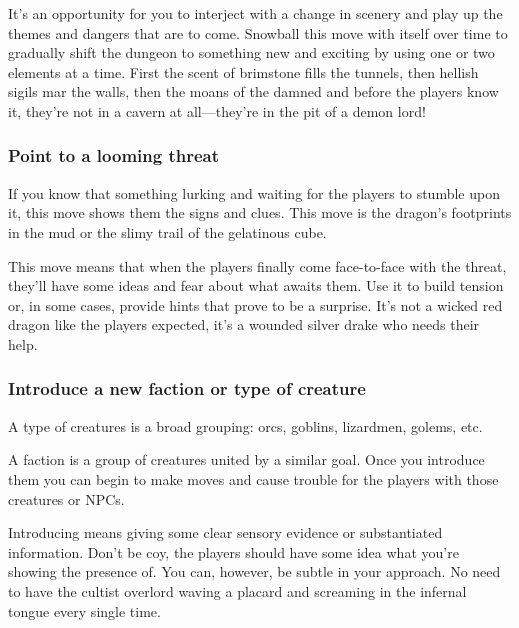        

It's an opportunity for you to interject with a change in scenery and play up the themes and dangers that are to come. Snowball this move with itself over time to gradually shift the dungeon to something new and exciting by using one or two elements at a time. First the scent of brimstone fills the tunnels, then hellish sigils mar the walls, then the moans of the damned and before the players know it, they're not in a cavern at all—they're in the pit of a demon lord!

       
\subsubsection{Point to a looming threat}    
       

If you know that something lurking and waiting for the players to stumble upon it, this move shows them the signs and clues. This move is the dragon's footprints in the mud or the slimy trail of the gelatinous cube.

       

This move means that when the players finally come face-to-face with the threat, they'll have some ideas and fear about what awaits them. Use it to build tension or, in some cases, provide hints that prove to be a surprise. It's not a wicked red dragon like the players expected, it's a wounded silver drake who needs their help.

       
\subsubsection{Introduce a new faction or type of creature}      
       

A type of creatures is a broad grouping: orcs, goblins, lizardmen, golems, etc.

       

A faction is a group of creatures united by a similar goal. Once you introduce them you can begin to make moves and cause trouble for the players with those creatures or NPCs.

       

Introducing means giving some clear sensory evidence or substantiated information. Don't be coy, the players should have some idea what you're showing the presence of. You can, however, be subtle in your approach. No need to have the cultist overlord waving a placard and screaming in the infernal tongue every single time.

